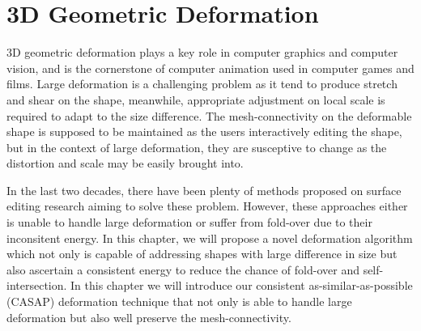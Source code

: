 \ifx\isEmbedded\undefined


\fi
\chapter{3D Geometric Deformation}
\label{chap:landmark}
3D geometric deformation plays a key role in computer graphics and computer vision, and is the cornerstone of computer animation used in computer games and films. Large deformation is a challenging problem as it tend to produce stretch and shear on the shape, meanwhile, appropriate adjustment on local scale is required to adapt to the size difference. The mesh-connectivity on the deformable shape is supposed to be maintained as the users interactively editing the shape, but in the context of large deformation, they are susceptive to change as the distortion and scale may be easily brought into.

In the last two decades, there have been plenty of methods proposed on surface editing research aiming to solve these problem. However, these approaches either is unable to handle large deformation or suffer from fold-over due to their inconsitent energy. In this chapter, we will propose a novel deformation algorithm which not only is capable of addressing shapes with large difference in size but also ascertain a consistent energy to reduce the chance of fold-over and self-intersection. In this chapter we will introduce our consistent as-similar-as-possible (CASAP) deformation technique that not only is able to handle large deformation but also well preserve the mesh-connectivity.

